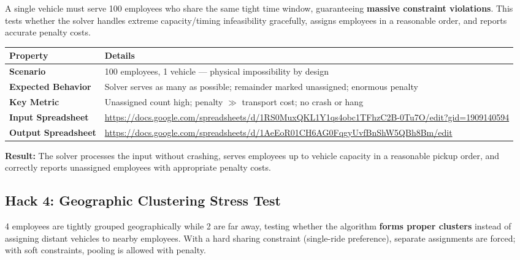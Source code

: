 \documentclass[11pt,a4paper]{article}
\begin{document}
\begin{hackbox}
A single vehicle must serve 100 employees who share the same tight time window, guaranteeing \textbf{massive constraint violations}. This tests whether the solver handles extreme capacity/timing infeasibility gracefully, assigns employees in a reasonable order, and reports accurate penalty costs.
\end{hackbox}

\begin{table}[H]
\centering
\begin{tabular}{p{3.5cm}p{10cm}}
\toprule
\textbf{Property} & \textbf{Details} \\
\midrule
\rowcolor{rowalt}
\textbf{Scenario} & 100 employees, 1 vehicle --- physical impossibility by design \\
\textbf{Expected Behavior} & Solver serves as many as possible; remainder marked unassigned; enormous penalty \\
\rowcolor{rowalt}
\textbf{Key Metric} & Unassigned count high; penalty $\gg$ transport cost; no crash or hang \\
\textbf{Input Spreadsheet} & \scriptsize\url{https://docs.google.com/spreadsheets/d/1RS0MuxQKL1Y1qs4obc1TFhzC2B-0Tu7O/edit?gid=1909140594} \\
\rowcolor{rowalt}
\textbf{Output Spreadsheet} & \scriptsize\url{https://docs.google.com/spreadsheets/d/1AeEoR01CH6AG0FqgyUvfBnShW5QBh8Bm/edit} \\
\bottomrule
\end{tabular}
\end{table}

\begin{resultbox}
\textbf{Result:} The solver processes the input without crashing, serves employees up to vehicle capacity in a reasonable pickup order, and correctly reports unassigned employees with appropriate penalty costs.
\end{resultbox}


\subsection{Hack 4: Geographic Clustering Stress Test}

\begin{hackbox}
4 employees are tightly grouped geographically while 2 are far away, testing whether the algorithm \textbf{forms proper clusters} instead of assigning distant vehicles to nearby employees. With a hard sharing constraint (single-ride preference), separate assignments are forced; with soft constraints, pooling is allowed with penalty.
\end{hackbox}
\end{document}
